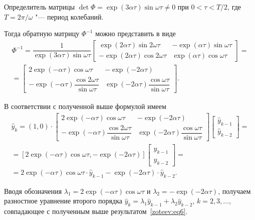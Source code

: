 Определитель матрицы $\det\Phi=\exp(3\alpha\tau)\sin\omega\tau \neq 0$ при $0<\tau<{T}/{2}$, где $T={2\pi}/{\omega}$ "--- период колебаний.

Тогда обратную матрицу $\Phi^{-1}$ можно представить в виде
\begin{multline}
\Phi^{-1}=\dfrac{1}{\exp(3\alpha\tau)\sin\omega\tau}\begin{bmatrix}
\exp(2\alpha\tau)\sin2\omega\tau & -\exp(\alpha\tau)\sin\omega\tau \\
-\exp(2\alpha\tau)\cos2\omega\tau & \exp(\alpha\tau)\cos\omega\tau
\end{bmatrix}=
\\
=\begin{bmatrix}
2\exp(-\alpha\tau)\cos\omega\tau & -\exp(-2\alpha\tau) \\
-\exp(-\alpha\tau)\dfrac{\cos2\omega\tau}{\sin\omega\tau} & \exp(-2\alpha\tau)\dfrac{\cos\omega\tau}{\sin\omega\tau}
\end{bmatrix}.
\end{multline}

В соответствии с полученной выше формулой имеем
\begin{multline}
\hat{y}_k=(1,0) \cdot \begin{bmatrix}
2\exp(-\alpha\tau)\cos\omega\tau & -\exp(-2\alpha\tau) \\
-\exp(-\alpha\tau)\dfrac{\cos2\omega\tau}{\sin\omega\tau} & \exp(-2\alpha\tau)\dfrac{\cos\omega\tau}{\sin\omega\tau}
\end{bmatrix}\begin{bmatrix}
\hat{y}_{k-1} \\ \hat{y}_{k-2} 
\end{bmatrix}=
\\
=[2\exp(-\alpha\tau)\cos\omega\tau,-\exp(-2\alpha\tau)]\begin{bmatrix}
\hat{y}_{k-1} \\ \hat{y}_{k-2} 
\end{bmatrix}=
\\
=2\exp(-\alpha\tau)\cos\omega\tau\cdot\hat{y}_{k-1}-\exp(-2\alpha\tau)\cdot\hat{y}_{k-2}.
\end{multline}

Вводя обозначения $\lambda_1=2\exp(-\alpha\tau)\cos\omega\tau$ и $\lambda_2=-\exp(-2\alpha\tau)$, получаем разностное уравнение второго порядка $\hat{y}_k=\lambda_1\hat{y}_{k-1}+\lambda_2\hat{y}_{k-2}$, $k=2,3,\dots$, совпадающее с полученным выше результатом~\eqref{zoteev:eq6}.

\pagebreak

